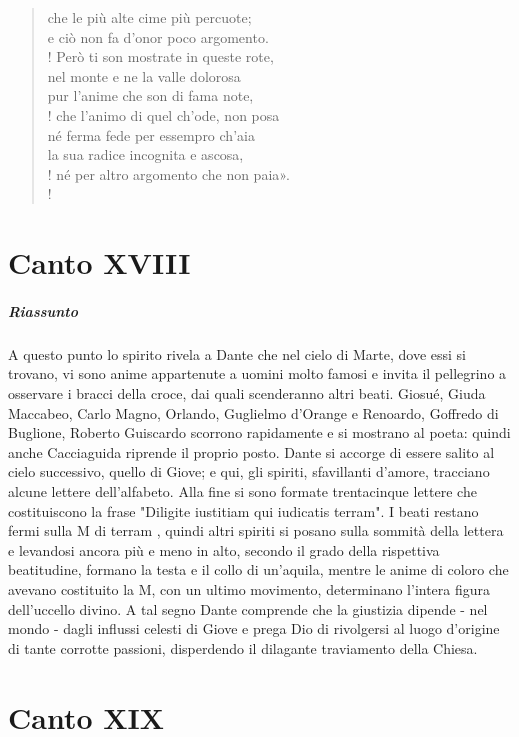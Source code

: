 \documentclass[a4paper, twoside, titlepage]{book}
\begin{document}
\begin{verse}
che le più alte cime più percuote;\\
e ciò non fa d’onor poco argomento.\\!
Però ti son mostrate in queste rote,\\
nel monte e ne la valle dolorosa\\
pur l’anime che son di fama note,\\!
che l’animo di quel ch’ode, non posa\\
né ferma fede per essempro ch’aia\\
la sua radice incognita e ascosa,\\!
né per altro argomento che non paia».\\!
\end{verse}

\chapter{Canto XVIII}

\paragraph{Riassunto} A questo punto lo spirito rivela a Dante che nel cielo di Marte, dove essi si trovano, vi sono anime appartenute a uomini molto famosi e invita il pellegrino a osservare i bracci della croce, dai quali scenderanno altri beati. Giosué, Giuda Maccabeo, Carlo Magno, Orlando, Guglielmo d’Orange e Renoardo, Goffredo di Buglione, Roberto Guiscardo scorrono rapidamente e si mostrano al poeta: quindi anche Cacciaguida riprende il proprio posto. Dante si accorge di essere salito al cielo successivo, quello di Giove; e qui, gli spiriti, sfavillanti d’amore, tracciano alcune lettere dell’alfabeto. Alla fine si sono formate trentacinque lettere che costituiscono la frase "Diligite iustitiam qui iudicatis terram". I beati restano fermi sulla M di terram , quindi altri spiriti si posano sulla sommità della lettera e levandosi ancora più e meno in alto, secondo il grado della rispettiva beatitudine, formano la testa e il collo di un’aquila, mentre le anime di coloro che avevano costituito la M, con un ultimo movimento, determinano l’intera figura dell’uccello divino. A tal segno Dante comprende che la giustizia dipende - nel mondo - dagli influssi celesti di Giove e prega Dio di rivolgersi al luogo d’origine di tante corrotte passioni, disperdendo il dilagante traviamento della Chiesa.

\chapter{Canto XIX}
\end{document}
